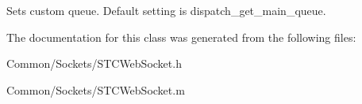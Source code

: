 Sets custom queue. Default setting is dispatch\+\_\+get\+\_\+main\+\_\+queue. 

The documentation for this class was generated from the following files\+:\begin{DoxyCompactItemize}
\item 
Common/\+Sockets/S\+T\+C\+Web\+Socket.\+h\item 
Common/\+Sockets/S\+T\+C\+Web\+Socket.\+m\end{DoxyCompactItemize}
